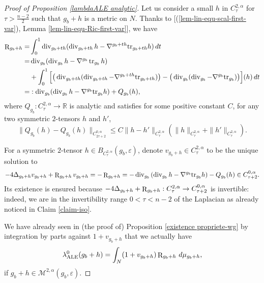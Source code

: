 \documentclass[a4paper,11pt,reqno]{amsart}
\def\tr{\mathop{\rm tr}\nolimits}
\def\div{\mathop{\rm div}\nolimits}
\def\tr{\mathop{\rm tr}\nolimits}
\def\div{\mathop{\rm div}\nolimits}
\def\R{\mathop{\rm R}\nolimits}
\numberwithin{equation}{section}
\begin{document}
	\begin{proof}[Proof of Proposition \ref{lambdaALE analytic}]
		Let us consider a small $h$ in $ C^{2,\alpha}_\tau$ for $\tau>\frac{n-2}{2}$ such that $g_b+h$ is a metric on $N$. Thanks to [(\ref{lem-lin-equ-scal-first-var}), Lemma \ref{lem-lin-equ-Ric-first-var}], we have
		\begin{align}
		\R_{g_b+h} =& \int_0^1 \div_{g_b+th}( \div_{g_b+th}h - \nabla^{g_b+th}\textup{tr}_{g_b+th}h )\,dt\\
		=& \div_{g_b}( \div_{g_b}h - \nabla^{g_b}\tr_{g_b}h ) \nonumber\\
		&+\int_0^1 \Big[\big(\div_{g_b+th}( \div_{g_b+th} - \nabla^{g_b+th}\textup{tr}_{g_b+th})\big)-\big(\div_{g_b}( \div_{g_b} - \nabla^{g_b}\textup{tr}_{g_b})\big)\Big](h)\, dt\nonumber\\
		=&:\div_{g_b}( \div_{g_b}h - \nabla^{g_b}\textup{tr}_{g_b}h ) + Q_{g_b}(h),\label{dvp scal}
		\end{align}
		where $Q_{g_b}:C^{2,\alpha}_\tau\to \mathbb{R}$ is analytic and satisfies for some positive constant $C$, for any two symmetric $2$-tensors $h$ and $h'$, $$\|Q_{g_b}(h)- Q_{g_b}(h)\|_{C^{0,\alpha}_{2\tau +2}}\leq C\|h-h'\|_{C^{2,\alpha}_{\tau}} \left(\|h\|_{C^{2,\alpha}_{\tau}}+\|h'\|_{C^{2,\alpha}_{\tau}}\right).$$
		
		For a symmetric $2$-tensor $h\in B_{C^{2,\alpha}_{\tau}}(g_b,\varepsilon)$, denote $v_{g_b+h}\in C^{2,\alpha}_\tau$ to be the unique solution to 
		$$-4\Delta_{g_b+h}v_{g_b+h} + \R_{g_b+h}v_{g_b+h} = -\R_{g_b+h} =- \div_{g_b}\left(\div_{g_b}h-\nabla^{g_b}\textup{tr}_{g_b}h\right) - Q_{g_b}(h) \in C^{0,\alpha}_{\tau+2}.$$
		Its existence is ensured because $-4\Delta_{g_b+h} + \R_{g_b+h}: C^{2,\alpha}_\tau\to C^{0,\alpha}_{\tau+2}$ is invertible: indeed, we are in the invertibility range $0<\tau<n-2$ of the Laplacian as already noticed in Claim \ref{claim-iso}.
		
		We have already seen in (the proof of) Proposition \ref{existence propriete-wg}  by integration by parts against $1+v_{g_b+h}$ that we actually have 
		$$\lambda_{\operatorname{ALE}}^0(g_b+h) = \int_N (1+v_{g_b+h})\R_{g_b+h}\,d\mu_{g_b+h},$$
		if $g_b+h\in\mathcal{M}^{2,\alpha}(g_b,\varepsilon)$.
		

\end{proof}
\end{document}
